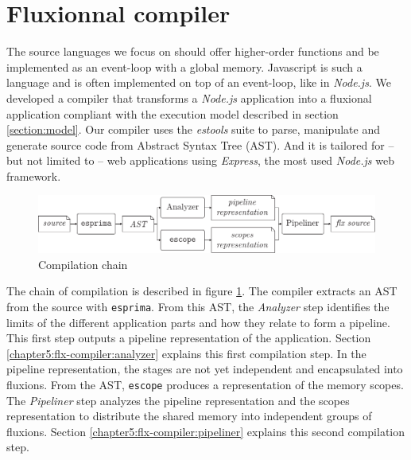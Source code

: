 \section{Fluxionnal compiler} \label{chapter5:flx-compiler}

The source languages we focus on should offer higher-order functions and be implemented as an event-loop with a global memory.
Javascript is such a language and is often implemented on top of an event-loop, like in \textit{Node.js}.
We developed a compiler that transforms a \textit{Node.js} application into a fluxional application compliant with the execution model described in section \ref{section:model}.
Our compiler uses the \textit{estools} suite to parse, manipulate and generate source code from Abstract Syntax Tree (AST).
And it is tailored for -- but not limited to -- web applications using \textit{Express}, the most used \textit{Node.js} web framework.

\begin{figure}
  \includegraphics[width=\linewidth]{../resources/compiler-stream.pdf}
  \caption{Compilation chain}
  \label{fig:compilation}
\end{figure}

The chain of compilation is described in figure \ref{fig:compilation}.
The compiler extracts an AST from the source with \texttt{esprima}.
From this AST, the \textit{Analyzer} step identifies the limits of the different application parts and how they relate to form a pipeline.
This first step outputs a pipeline representation of the application.
Section \ref{chapter5:flx-compiler:analyzer} explains this first compilation step.
In the pipeline representation, the stages are not yet independent and encapsulated into fluxions.
From the AST, \texttt{escope} produces a representation of the memory scopes.
The \textit{Pipeliner} step analyzes the pipeline representation and the scopes representation to distribute the shared memory into independent groups of fluxions.
Section \ref{chapter5:flx-compiler:pipeliner} explains this second compilation step.


